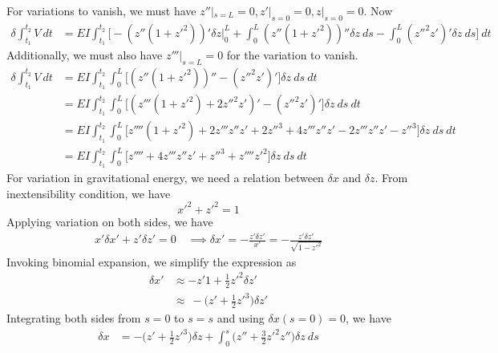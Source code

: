 For variations to vanish, we must have $z''|_{s=L} = 0, z'|_{s=0} = 0, z|_{s=0} =0$.
Now
\begin{align*}
\delta \int_{t_1}^{t_2} V~dt  &= EI \int_{t_1}^{t_2} \bigg[-(z''(1 + z'^2))'\delta z\bigg|_0^L + \int_0^L (z''(1 + z'^2))''\delta z~ds - \int_0^L (z''^2z')'\delta z~ds\bigg]~dt 
\end{align*}
Additionally, we must also have $z'''|_{s = L} = 0$ for the variation to vanish. 
\begin{align*}
\delta \int_{t_1}^{t_2} V~dt  &= EI \int_{t_1}^{t_2} \int_0^L \bigg[(z''(1 + z'^2))'' -  (z''^2z')'\bigg]\delta z~ds~dt  \\
  &= EI \int_{t_1}^{t_2} \int_0^L \bigg[(z'''(1 + z'^2)+ 2z''^2z')' -  (z''^2z')'\bigg]\delta z~ds~dt  \\
 &= EI \int_{t_1}^{t_2} \int_0^L \bigg[z''''(1 + z'^2) + 2z'''z''z' + 2z''^3 + 4z'''z''z' - 2z'''z''z' -  z''^3\bigg]\delta z~ds~dt  \\
  &= EI \int_{t_1}^{t_2} \int_0^L \bigg[z'''' +  4z'''z''z'  +  z''^3 +  z''''z'^2\bigg]\delta z~ds~dt
\end{align*}
For variation in gravitational energy, we need a relation between $\delta x$ and $\delta z$. From inextensibility condition, we have
$${x'}^2 + {z'}^2 =  1$$
Applying variation on both sides, we have
\begin{align*}
   x'\delta x' + z'\delta z' = 0 \quad \implies \delta x' = - \frac{z'\delta z'}{x'} = - \frac{z'\delta z'}{\sqrt{1 - {z'}^2}}
\end{align*}
Invoking binomial expansion, we simplify the expression as
\begin{align*}
 \delta x' &\approx - z'1 + \frac{1}{2}{z'}^2 \delta z' \\
           &\approx ~- \bigg({z'} + \frac{1}{2}{z'}^3\bigg)\delta z' 
\end{align*}
Integrating both sides from $s = 0$ to $s = s$ and using $\delta x (s = 0) = 0$, we have
\begin{align}
  \delta x &= - \bigg(z' + \frac{1}{2}{z'}^3\bigg)\delta z + \int_0^s \bigg(z'' + \frac{3}{2}{z'}^2z''\bigg)\delta z~ds \label{eqn:x-z-relation}
\end{align}


